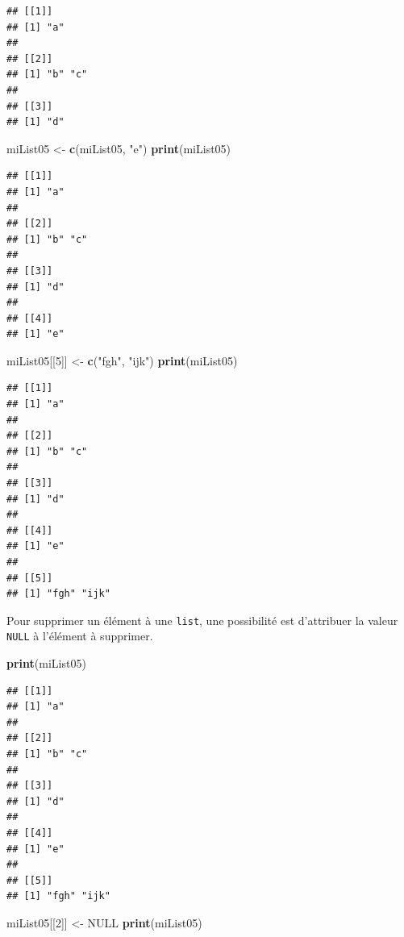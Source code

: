 \documentclass[twoside,symmetric]{book}
\newenvironment{Shaded}{}{}
\newcommand{\DecValTok}[1]{#1}
\newcommand{\KeywordTok}[1]{\textbf{#1}}
\newcommand{\NormalTok}[1]{#1}
\newcommand{\OtherTok}[1]{#1}
\newcommand{\StringTok}[1]{#1}
\begin{document}
\begin{verbatim}
## [[1]]
## [1] "a"
## 
## [[2]]
## [1] "b" "c"
## 
## [[3]]
## [1] "d"
\end{verbatim}

\begin{Shaded}
\begin{Highlighting}[]
\NormalTok{miList05 <-}\StringTok{ }\KeywordTok{c}\NormalTok{(miList05, }\StringTok{"e"}\NormalTok{)}
\KeywordTok{print}\NormalTok{(miList05)}
\end{Highlighting}
\end{Shaded}

\begin{verbatim}
## [[1]]
## [1] "a"
## 
## [[2]]
## [1] "b" "c"
## 
## [[3]]
## [1] "d"
## 
## [[4]]
## [1] "e"
\end{verbatim}

\begin{Shaded}
\begin{Highlighting}[]
\NormalTok{miList05[[}\DecValTok{5}\NormalTok{]] <-}\StringTok{ }\KeywordTok{c}\NormalTok{(}\StringTok{"fgh"}\NormalTok{, }\StringTok{"ijk"}\NormalTok{)}
\KeywordTok{print}\NormalTok{(miList05)}
\end{Highlighting}
\end{Shaded}

\begin{verbatim}
## [[1]]
## [1] "a"
## 
## [[2]]
## [1] "b" "c"
## 
## [[3]]
## [1] "d"
## 
## [[4]]
## [1] "e"
## 
## [[5]]
## [1] "fgh" "ijk"
\end{verbatim}

Pour supprimer un élément à une \texttt{list}, une possibilité est d'attribuer la valeur \texttt{NULL} à l'élément à supprimer.

\begin{Shaded}
\begin{Highlighting}[]
\KeywordTok{print}\NormalTok{(miList05)}
\end{Highlighting}
\end{Shaded}

\begin{verbatim}
## [[1]]
## [1] "a"
## 
## [[2]]
## [1] "b" "c"
## 
## [[3]]
## [1] "d"
## 
## [[4]]
## [1] "e"
## 
## [[5]]
## [1] "fgh" "ijk"
\end{verbatim}

\begin{Shaded}
\begin{Highlighting}[]
\NormalTok{miList05[[}\DecValTok{2}\NormalTok{]] <-}\StringTok{ }\OtherTok{NULL}
\KeywordTok{print}\NormalTok{(miList05)}
\end{Highlighting}
\end{Shaded}
\end{document}
